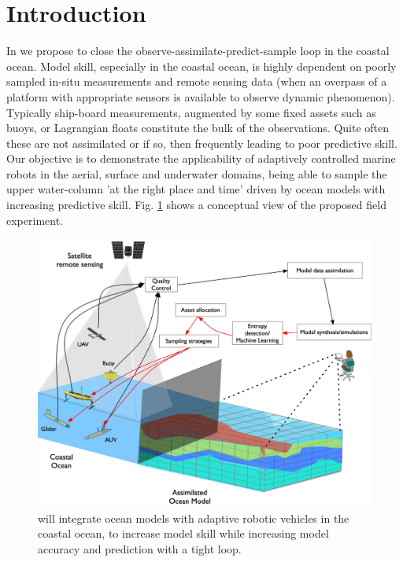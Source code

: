 \section*{Introduction}

In \proj we propose to close the observe-assimilate-predict-sample
loop in the coastal ocean. Model skill, especially in the coastal ocean,
is highly dependent on poorly sampled in-situ measurements and remote
sensing data (when an overpass of a platform with appropriate sensors
is available to observe dynamic phenomenon). Typically ship-board
measurements, augmented by some fixed assets such as buoys, or
Lagrangian floats constitute the bulk of the observations. Quite often
these are not assimilated or if so, then frequently leading to poor
predictive skill. Our objective is to demonstrate the applicability of
adaptively controlled marine robots in the aerial, surface and
underwater domains, being able to sample the upper water-column 'at
the right place and time' driven by ocean models with increasing
predictive skill. Fig. \ref{fig:block-diag} shows a conceptual view of
the proposed field experiment.

\begin{figure}[!b]
  \centering
  \includegraphics[scale=0.15]{fig/ensemble.jpg}
  \caption{\proj will integrate ocean models with adaptive robotic vehicles
    in the coastal ocean, to increase model skill while increasing
    model accuracy and prediction with a tight loop.}
  \label{fig:block-diag}
\end{figure}

